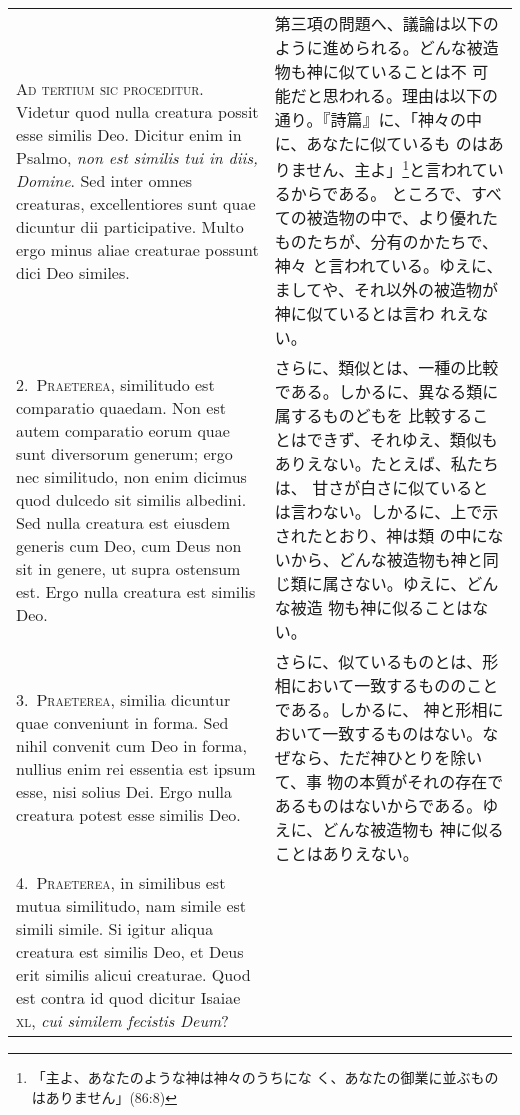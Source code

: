 \documentclass[10pt]{jsarticle} %
\begin{document}
\begin{longtable}{p{21em}p{21em}}
{\huge A}{\scshape d tertium sic proceditur}. Videtur quod nulla
 creatura possit esse similis Deo. Dicitur enim in Psalmo, {\itshape non est
 similis tui in diis, Domine}. Sed inter omnes creaturas, excellentiores
 sunt quae dicuntur dii participative. Multo ergo minus aliae creaturae
 possunt dici Deo similes.


&

第三項の問題へ、議論は以下のように進められる。どんな被造物も神に似ていることは不
 可能だと思われる。理由は以下の通り。『詩篇』に、「神々の中に、あなたに似ているも
 のはありません、主よ」\footnote{「主よ、あなたのような神は神々のうちにな
 く、あなたの御業に並ぶものはありません」(86:8)}と言われているからである。
 ところで、すべての被造物の中で、より優れたものたちが、分有のかたちで、神々
 と言われている。ゆえに、ましてや、それ以外の被造物が神に似ているとは言わ
 れえない。

\\



2.~{\scshape Praeterea}, similitudo est comparatio quaedam. Non est
 autem comparatio eorum quae sunt diversorum generum; ergo nec
 similitudo, non enim dicimus quod dulcedo sit similis albedini. Sed
 nulla creatura est eiusdem generis cum Deo, cum Deus non sit in genere,
 ut supra ostensum est. Ergo nulla creatura est similis Deo.
&

さらに、類似とは、一種の比較である。しかるに、異なる類に属するものどもを
 比較することはできず、それゆえ、類似もありえない。たとえば、私たちは、
 甘さが白さに似ているとは言わない。しかるに、上で示されたとおり、神は類
 の中にないから、どんな被造物も神と同じ類に属さない。ゆえに、どんな被造
 物も神に似ることはない。

\\

3.~{\scshape Praeterea}, similia dicuntur quae conveniunt in forma. Sed
 nihil convenit cum Deo in forma, nullius enim rei essentia est ipsum
 esse, nisi solius Dei. Ergo nulla creatura potest esse similis Deo.

&

さらに、似ているものとは、形相において一致するもののことである。しかるに、
 神と形相において一致するものはない。なぜなら、ただ神ひとりを除いて、事
 物の本質がそれの存在であるものはないからである。ゆえに、どんな被造物も
 神に似ることはありえない。

\\

4.~{\scshape Praeterea}, in similibus est mutua similitudo, nam simile
 est simili simile. Si igitur aliqua creatura est similis Deo, et Deus
 erit similis alicui creaturae. Quod est contra id quod dicitur Isaiae
 {\scshape xl}, {\itshape cui similem fecistis Deum}?


\end{longtable}
\end{document}
